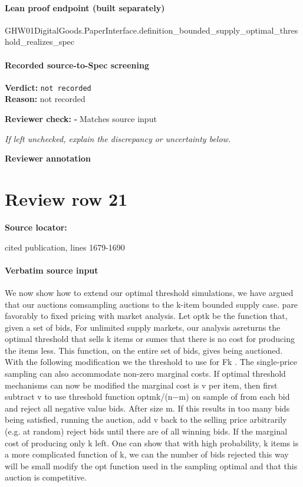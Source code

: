 \documentclass[10pt]{article}
\newcommand{\reviewerbox}{%
  \par\noindent\fbox{\parbox{0.96\linewidth}{\rule{0pt}{0.38in}}}\par
}
\newcommand{\reviewmatch}[1]{%
  \par\noindent\textbf{Reviewer check:} $\square$\; #1\par
  \noindent\emph{If left unchecked, explain the discrepancy or uncertainty below.}\par
}
\begin{document}
\paragraph{Lean proof endpoint (built separately)}\begin{ReviewVerbatim}
GHW01DigitalGoods.PaperInterface.definition_bounded_supply_optimal_threshold_realizes_spec
\end{ReviewVerbatim}

\paragraph{Recorded source-to-Spec screening}
\textbf{Verdict:} \texttt{not recorded}
\\
\textbf{Reason:} not recorded
\reviewmatch{Matches source input}
\noindent\textbf{Reviewer annotation}\par
\reviewerbox
\clearpage
\hypertarget{source-claim-ec9d72942c947690}{}
\section*{Review row 21}
\textbf{Source locator:} {\footnotesize\raggedright cited publication, lines 1679-\allowbreak{}1690\par}
\paragraph{Verbatim source input}
\begin{ReviewVerbatim}
We now show how to extend our optimal threshold simulations, we have argued that our auctions comsampling auctions to the k-item bounded supply case. pare favorably to fixed pricing with market analysis.
Let optk be the function that, given a set of bids,
For unlimited supply markets, our analysis asreturns the optimal threshold that sells k items or sumes that there is no cost for producing the items
less. This function, on the entire set of bids, gives being auctioned. With the following modification we
the threshold to use for Fk . The single-price sampling can also accommodate non-zero marginal costs. If
optimal threshold mechanisms can now be modified the marginal cost is v per item, then first subtract v
to use threshold function optmk/(n−m) on sample of from each bid and reject all negative value bids. After
size m. If this results in too many bids being satisfied, running the auction, add v back to the selling price
arbitrarily (e.g. at random) reject bids until there are of all winning bids. If the marginal cost of producing
only k left. One can show that with high probability, k items is a more complicated function of k, we can
the number of bids rejected this way will be small modify the opt function used in the sampling optimal
and that this auction is competitive.
\end{ReviewVerbatim}
\end{document}

